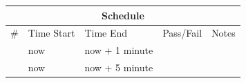 \documentclass{article}
\begin{document}
\begin{enumerate}
	\vspace{0.25in}
	\begin{tabular}{|l|l|l|l|l|}
		\hline
		\multicolumn{5}{|c|}{Schedule} \\
		\hline
		\# & Time Start & Time End & Pass/Fail & \hspace{0.5in}Notes\hspace{0.5in} \\
		\hline
		& now & now + 1 minute & & \\
		\hline
		& now & now + 5 minute & & \\
		\hline
	\end{tabular}

\end{enumerate}

\end{document}
